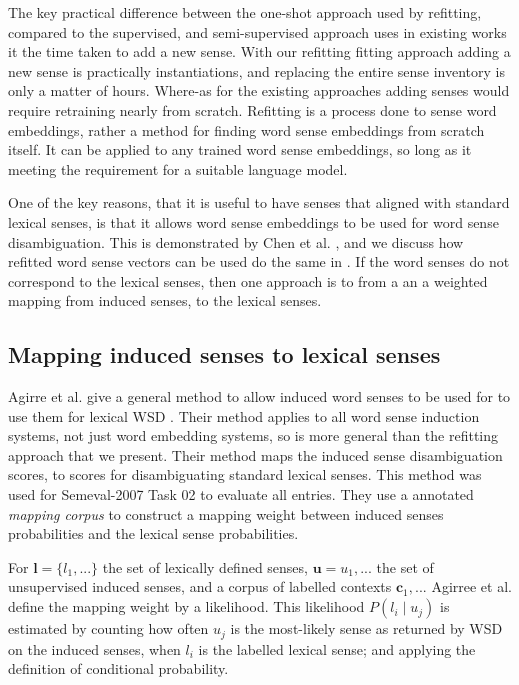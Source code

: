 \documentclass{sig-alternate}
\renewcommand{\c}{\mathbf{c}}
\renewcommand{\l}{\mathbf{l}}
\renewcommand{\u}{\mathbf{u}}
\begin{document}
The key practical difference between the one-shot approach used by refitting, compared to the supervised, and semi-supervised approach uses in existing works it the time taken to  add a new sense. With our refitting fitting approach adding a new sense is practically instantiations, and replacing the entire sense inventory is only a matter of hours. Where-as for the existing approaches adding senses would require retraining nearly from scratch. Refitting is a process done to sense word embeddings, rather a method for finding word sense embeddings from scratch itself. It can be applied to any trained word sense embeddings, so long as it meeting the requirement for a suitable language model.

One of the key reasons, that it is useful to have senses that aligned with standard lexical senses, is that it allows word sense embeddings to be used for word sense disambiguation. This is demonstrated by Chen et al.  \parencite{Chen2014}, and we discuss how refitted word sense vectors can be used do the same in . If the word senses do not correspond to the lexical senses, then one approach is to from a an a weighted mapping from induced senses, to the lexical senses.

\subsection{Mapping induced senses to lexical senses}\label{mapping}
 Agirre et al. give a general method to allow induced word senses to be used for to use them for lexical WSD \parencite{agirre2006}.
Their method applies to all word sense induction systems, not just word embedding systems, so is more general than the refitting approach that we present.
Their method maps the induced sense disambiguation scores, to scores for disambiguating standard lexical senses. This method was used for Semeval-2007 Task 02 \parencite{SemEval2007WSIandWSD} to evaluate all entries.
They use a annotated \emph{mapping corpus} to construct a mapping weight between induced senses probabilities and the lexical sense probabilities.

For $\l=\{l_1,...\}$ the set of lexically defined senses, $\u={u_1,...}$ the set of unsupervised induced senses, and a corpus of labelled contexts ${\c_1, ...}$ Agirree et al. define the mapping weight by a likelihood.
This likelihood $P(l_i \mid u_j)$ is estimated by counting how often $u_j$ is the most-likely sense as returned by WSD on the induced senses, when $l_i$ is the labelled lexical sense; and applying the definition of conditional probability.
\end{document}
